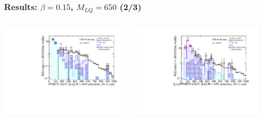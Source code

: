 \documentclass[bigger]{beamer}
\begin{document}
\begin{frame}
\frametitle{Results: $\beta = 0.15$, $M_{LQ} = 650$ (2/3)}
\label{sec-5-4-2}
\begin{columns}
\begin{column}{0.6\textwidth}
\label{sec-5-4-2-1}

\centering
\met
\includegraphics[width=\textwidth]{fig/enu/nMinus1/MET_stAndMtAndMejLQ650_enujj.pdf}
\end{column}
\begin{column}{0.6\textwidth}
\label{sec-5-4-2-2}

\centering
\mt
\includegraphics[width=\textwidth]{fig/enu/nMinus1/MTenu_stAndMetAndMejLQ650_enujj.pdf}
\end{column}
\end{columns}
\end{frame}
\end{document}

